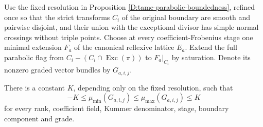 \begin{lemma}
\label{D:saturated-boundary-two-sided-slopes}
Use the fixed resolution in Proposition
\ref{D:tame-parabolic-boundedness}, refined once so that the
strict transforms $C_i$ of the original boundary are smooth
and pairwise disjoint, and their union with the exceptional
divisor has simple normal crossings without triple points.
Choose at every coefficient-Frobenius stage one minimal
extension $F_a$ of the canonical reflexive lattice $E_a$.
Extend the full parabolic flag from
$C_i-(C_i\cap\operatorname{Exc}(\pi))$ to $F_a|_{C_i}$
by saturation.  Denote its nonzero graded vector bundles by
$G_{a,i,j}$.

There is a constant $K$, depending only on the fixed
resolution, such that
\[
                -K\le\mu_{\min}(G_{a,i,j})
                    \le\mu_{\max}(G_{a,i,j})\le K
\]
for every rank, coefficient field, Kummer denominator,
stage, boundary component and grade.
\end{lemma}

